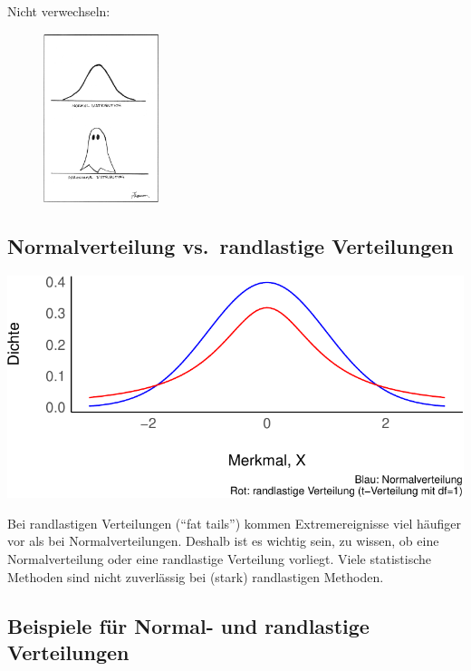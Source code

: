 \documentclass[
  a4paper,
  DIV=11]{scrreprt}
\theoremstyle{definition}
\theoremstyle{remark}
\begin{document}
Nicht verwechseln:

\begin{figure}

{\centering \includegraphics[width=0.3\textwidth,height=\textheight]{./img/ch33910f1.jpg}

}

\end{figure}

\hypertarget{normalverteilung-vs.-randlastige-verteilungen}{%
\subsection{Normalverteilung vs.~randlastige
Verteilungen}\label{normalverteilung-vs.-randlastige-verteilungen}}

\includegraphics{./Verteilungen_files/figure-pdf/Normalverteilung-9-1.pdf}

Bei randlastigen Verteilungen (``fat tails'') kommen Extremereignisse
viel häufiger vor als bei Normalverteilungen. Deshalb ist es wichtig
sein, zu wissen, ob eine Normalverteilung oder eine randlastige
Verteilung vorliegt. Viele statistische Methoden sind nicht zuverlässig
bei (stark) randlastigen Methoden.

\hypertarget{beispiele-fuxfcr-normal--und-randlastige-verteilungen}{%
\subsection{Beispiele für Normal- und randlastige
Verteilungen}\label{beispiele-fuxfcr-normal--und-randlastige-verteilungen}}
\end{document}

